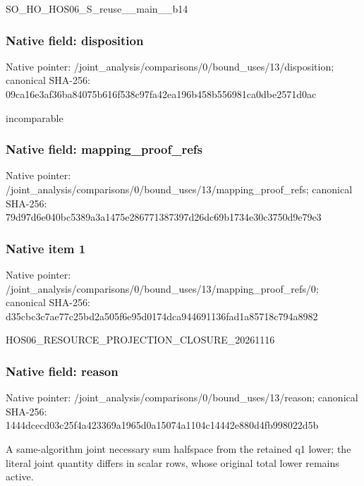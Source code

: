 \documentclass[10pt,a4paper]{article}
\begin{document}
\begingroup\raggedright\sloppy SO\_\allowbreak{}HO\_\allowbreak{}HOS06\_\allowbreak{}S\_\allowbreak{}reuse\_\allowbreak{}\_\allowbreak{}main\_\allowbreak{}\_\allowbreak{}b14\par\endgroup

\subsubsection{Native field: disposition}
Native pointer: /joint\_\allowbreak{}analysis/comparisons/0/bound\_\allowbreak{}uses/13/disposition; canonical SHA-256: 09ca16e3af36ba84075b616f538c97fa42ea196b458b556981ca0dbe2571d0ac

\begingroup\raggedright\sloppy incomparable\par\endgroup

\subsubsection{Native field: mapping\_\allowbreak{}proof\_\allowbreak{}refs}
Native pointer: /joint\_\allowbreak{}analysis/comparisons/0/bound\_\allowbreak{}uses/13/mapping\_\allowbreak{}proof\_\allowbreak{}refs; canonical SHA-256: 79d97d6e040bc5389a3a1475e286771387397d26dc69b1734e30c3750d9e79e3

\subsubsection{Native item 1}
Native pointer: /joint\_\allowbreak{}analysis/comparisons/0/bound\_\allowbreak{}uses/13/mapping\_\allowbreak{}proof\_\allowbreak{}refs/0; canonical SHA-256: d35cbc3c7ae77c25bd2a505f6e95d0174dca944691136fad1a85718c794a8982

\begingroup\raggedright\sloppy HOS06\_\allowbreak{}RESOURCE\_\allowbreak{}PROJECTION\_\allowbreak{}CLOSURE\_\allowbreak{}20261116\par\endgroup

\subsubsection{Native field: reason}
Native pointer: /joint\_\allowbreak{}analysis/comparisons/0/bound\_\allowbreak{}uses/13/reason; canonical SHA-256: 1444dcecd03c25f4a423369a1965d0a15074a1104c14442e880d4fb998022d5b

\begingroup\raggedright\sloppy A same-algorithm joint necessary sum halfspace from the retained q1 lower;\allowbreak{} the literal joint quantity differs in scalar rows,\allowbreak{} whose original total lower remains active.\par\endgroup
\end{document}
